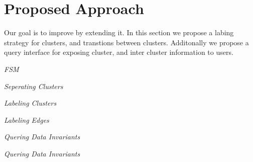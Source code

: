 \section{Proposed Approach}
\label{sec:proposed-approach}

Our goal is to improve \dviz by extending it. In this section we
propose a labing strategy for clusters, and transtions between
clusters. Additonally we propose a query interface for exposing
cluster, and inter cluster information to users.

\noindent\textit{FSM}

\noindent\textit{Seperating Clusters}

\noindent\textit{Labeling Clusters}

\noindent\textit{Labeling Edges}

\noindent\textit{Quering Data Invariants}

\noindent\textit{Quering Data Invariants}
